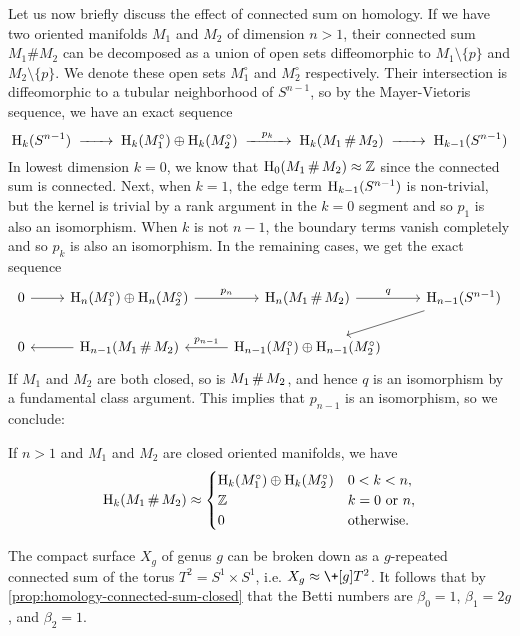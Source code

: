 Let us now briefly discuss the effect of connected sum on homology. If we have two oriented manifolds $M_1$ and $M_2$ of dimension $n>1$, their connected sum $M_1\# M_2$ can be decomposed as a union of open sets diffeomorphic to $M_1\setminus\{p\}$ and $M_2\setminus\{p\}$. We denote these open sets $M_1^\circ$ and $M_2^\circ$ respectively. Their intersection is diffeomorphic to a tubular neighborhood of $S^{n-1}$, so by the Mayer-Vietoris sequence, we have an exact sequence
\[
	\H_k(S^{n-1})\lkxto \H_k(M_1^\circ)\oplus \H_k(M_2^\circ)\lkxto[p_k] \H_k(M_1\+M_2)\lkxto \H_{k-1}(S^{n-1})
\]
In lowest dimension $k=0$, we know that $\H_0(M_1\+ M_2)\cong \Z$ since the connected sum is connected. Next, when $k=1$, the edge term $\operatorname{H}_{k-1}(S^{n-1})$ is non-trivial, but the kernel is trivial by a rank argument in the $k=0$ segment and so $p_1$ is also an isomorphism.
When $k$ is not $n-1$, the boundary terms vanish completely and so $p_k$ is also an isomorphism. In the remaining cases, we get the exact sequence
\begin{equation}\label{eq:connected-sum-cohomology}
	\begin{tikzcd}
	0 & {\H_n(M_1^\circ)\oplus \H_n(M_2^\circ)} & {\H_n(M_1\+M_2)} & {\H_{n-1}(S^{n-1})} \\
	0 & {\H_{n-1}(M_1\+M_2)} & {\H_{n-1}(M_1^\circ)\oplus \H_{n-1}(M_2^\circ)}
	\arrow[from=1-1, to=1-2]
	\arrow["p_n", from=1-2, to=1-3]
	\arrow["q", from=1-3, to=1-4]
	\arrow[from=1-4, to=2-3]
	\arrow[from=2-2, to=2-1]
	\arrow["p_{n-1}"',from=2-3, to=2-2]
\end{tikzcd}
\end{equation}
If $M_1$ and $M_2$ are both closed, so is $M_1\+M_2$, and hence $q$ is an isomorphism by a fundamental class argument. This implies that $p_{n-1}$ is an isomorphism, so we conclude:

\begin{proposition}\label{prop:homology-connected-sum-closed}
	If $n>1$ and $M_1$ and $M_2$ are closed oriented manifolds, we have
	\[
		\H_k(M_1\+M_2) \cong \begin{cases}
			\H_k(M_1^\circ)\oplus \H_k(M_2^\circ) & 0 < k < n,\\
			\Z & k=0\textrm{ or }n,\\
			0 & \textrm{otherwise.}
		\end{cases}
	\]
\end{proposition}

\begin{example}
	The compact surface $X_g$ of genus $g$ can be broken down as a $g$-repeated connected sum of the torus $T^2=S^1\times S^1$, i.e. $X_g \cong \+[g] T^2$. It follows that by \cref{prop:homology-connected-sum-closed} that the Betti numbers are $\beta_0=1$, $\beta_1=2g$, and $\beta_2=1$.
\end{example}

